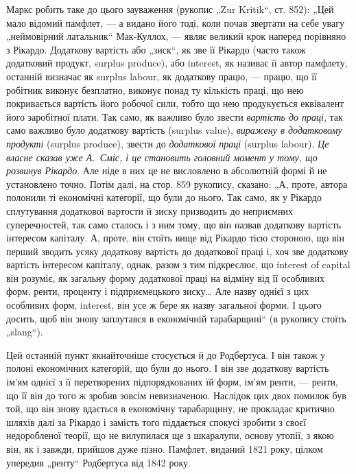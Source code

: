 Маркс робить таке до цього зауваження (рукопис „Zur Kritik“,
ст. 852): „Цей мало відомий памфлет, — а видано його тоді, коли почав
звертати на себе увагу „неймовірний латальник“ Мак-Куллох, — являє
великий крок наперед порівняно з Рікардо. Додаткову вартість або
„зиск“, як зве її Рікардо (часто також додатковий продукт, surplus
produce), або interest, як називає її автор памфлету, останній визначає як
surplus labour, як додаткову працю, — працю, що її робітник виконує безплатно,
виконує понад ту кількість праці, що нею покривається вартість
його робочої сили, тобто що нею продукується еквівалент його заробітної
плати. Так само, як важливо було звести  \emph{вартість до праці}, так
само важливо було додаткову вартість (surplus value), \emph{виражену в додатковому
продукті} (surplus produce), звести до \emph{додаткової праці}
(surplus labour). \emph{Це власне сказав уже А.~Сміс, і це становить головний
момент у тому, що розвинув Рікардо}. Але ніде в них це не
висловлено в абсолютній формі й не установлено точно. Потім далі, на
стор. 859 рукопису, сказано: „А, проте, автора полонили ті економічні
категорії, що були до нього. Так само, як у Рікардо сплутування додаткової
вартости й зиску призводить до неприємних суперечностей, так
само сталось і з ним тому, що він назвав додаткову вартість
інтересом капіталу. А, проте, він стоїть вище від Рікардо тією стороною, що
він перший зводить усяку додаткову вартість до додаткової праці і, хоч зве
додаткову вартість інтересом капіталу, однак, разом з тим підкреслює,
що interest of capital він розуміє, як загальну форму
додаткової праці на відміну від її особливих форм, ренти, проценту і
підприємецького зиску\dots{} Але назву однієї з цих особливих форм, interest,
він усе ж бере як назву загальної форми. І цього досить, щоб він знову
заплутався в економічній тарабарщині“ (в рукопису стоїть „slang“).

Цей останній пункт якнайточніше стосується й до Родбертуса. І він
також у полоні економічних категорій, що були до нього. І він зве
додаткову вартість ім’ям однієї з її перетворених підпорядкованих їй форм,
ім’ям ренти, — ренти, що її він до того ж зробив зовсім невизначеною.
Наслідок цих двох помилок був той, що він знову вдається в економічну
тарабарщину, не прокладає критично шляхів далі за Рікардо і замість
того піддається спокусі зробити з своєї недоробленої теорії, що не
вилупилася ще з шкаралупи, основу утопії, з якою він, як і завжди,
прийшов дуже пізно. Памфлет, виданий 1821 року, цілком упередив
„ренту“ Родбертуса від 1842 року.

